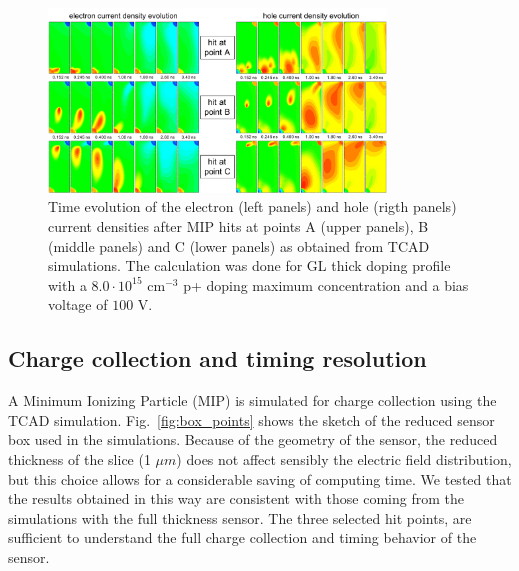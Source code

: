 \documentclass[aps,pt14,superscriptaddress,showpacs,floatfix,nofootinbib]{revtex4}
\begin{document}
\begin{figure}[hbtp]
\begin{center}
\includegraphics[width=0.80\textwidth,keepaspectratio]{figures1/MIP_current_evolution_ABC.pdf}\hspace{0.7cm}
\caption{Time evolution of the electron (left panels) and hole (rigth panels) current densities after MIP hits at points A (upper panels), B (middle panels) and C (lower panels) as obtained from TCAD simulations. The calculation was done for GL thick doping profile with a $8.0\cdot 10^{15}$ cm$^{-3}$ p+ doping maximum concentration and a bias voltage of $100$ V.\label{fig:MIP-timeevolution}}  
\end{center}
\end{figure}



\subsection{Charge collection and timing resolution} 

A Minimum Ionizing Particle (MIP) is simulated for charge collection using the TCAD simulation. Fig.~\ref{fig:box_points} shows the sketch of the reduced sensor box used in the simulations. Because of the geometry of the sensor, the reduced thickness of the slice (1 $\mu m$) does not affect sensibly the electric field distribution, but this choice allows for a considerable saving of computing time. We tested that the results obtained in this way are consistent with those coming from the simulations with the full thickness sensor. The three selected hit points, are sufficient to understand the full charge collection and timing behavior of the sensor.    
 
\end{document}
